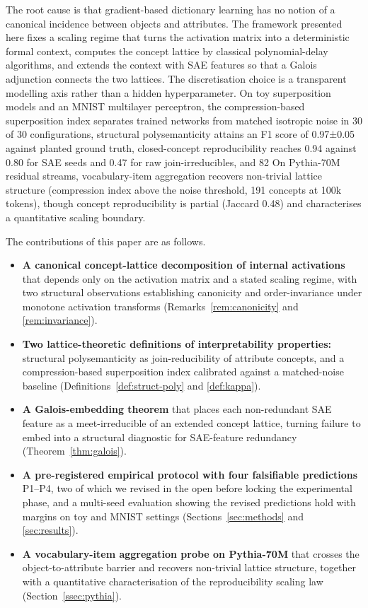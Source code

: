\documentclass[a4paper,fleqn]{cas-dc}
\begin{document}
The root cause is that gradient-based dictionary learning has no notion of a canonical incidence between objects and attributes.
The framework presented here fixes a scaling regime that turns the activation matrix into a deterministic formal context, computes the concept lattice by classical polynomial-delay algorithms, and extends the context with SAE features so that a Galois adjunction connects the two lattices.
The discretisation choice is a transparent modelling axis rather than a hidden hyperparameter.
On toy superposition models and an MNIST multilayer perceptron, the compression-based superposition index separates trained networks from matched isotropic noise in 30 of 30 configurations, structural polysemanticity attains an F1 score of 0.97±0.05 against planted ground truth, closed-concept reproducibility reaches 0.94 against 0.80 for SAE seeds and 0.47 for raw join-irreducibles, and 82%
On Pythia-70M residual streams, vocabulary-item aggregation recovers non-trivial lattice structure (compression index above the noise threshold, 191 concepts at 100k tokens), though concept reproducibility is partial (Jaccard 0.48) and characterises a quantitative scaling boundary.

The contributions of this paper are as follows.
\begin{itemize}
  \item \textbf{A canonical concept-lattice decomposition of internal activations} that depends only on the activation matrix and a stated scaling regime, with two structural observations establishing canonicity and order-invariance under monotone activation transforms (Remarks~\ref{rem:canonicity} and \ref{rem:invariance}).
  \item \textbf{Two lattice-theoretic definitions of interpretability properties:} structural polysemanticity as join-reducibility of attribute concepts, and a compression-based superposition index calibrated against a matched-noise baseline (Definitions~\ref{def:struct-poly} and \ref{def:kappa}).
  \item \textbf{A Galois-embedding theorem} that places each non-redundant SAE feature as a meet-irreducible of an extended concept lattice, turning failure to embed into a structural diagnostic for SAE-feature redundancy (Theorem~\ref{thm:galois}).
  \item \textbf{A pre-registered empirical protocol with four falsifiable predictions} P1--P4, two of which we revised in the open before locking the experimental phase, and a multi-seed evaluation showing the revised predictions hold with margins on toy and MNIST settings (Sections~\ref{sec:methods} and \ref{sec:results}).
  \item \textbf{A vocabulary-item aggregation probe on Pythia-70M} that crosses the object-to-attribute barrier and recovers non-trivial lattice structure, together with a quantitative characterisation of the reproducibility scaling law (Section~\ref{ssec:pythia}).
\end{itemize}
\end{document}
